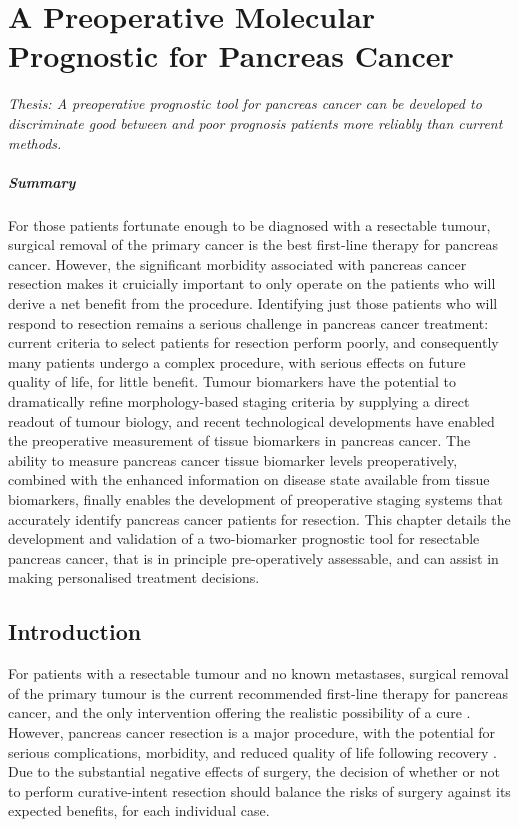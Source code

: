 \documentclass[dissertation.tex]{subfiles}
\begin{document}
\chapter{A Preoperative Molecular Prognostic for Pancreas Cancer}
\label{chap:nomogram}

\emph{Thesis: A preoperative prognostic tool for pancreas cancer can be developed to discriminate good between and poor prognosis patients more reliably than current methods.}

\paragraph{Summary}
For those patients fortunate enough to be diagnosed with a resectable tumour, surgical removal of the primary cancer is the best first-line therapy for pancreas cancer.  However, the significant morbidity associated with pancreas cancer resection makes it cruicially important to only operate on the patients who will derive a net benefit from the procedure.  Identifying just those patients who will respond to resection remains a serious challenge in pancreas cancer treatment: current criteria to select patients for resection perform poorly, and consequently many patients undergo a complex procedure, with serious effects on future quality of life, for little benefit.  Tumour biomarkers have the potential to dramatically refine morphology-based staging criteria by supplying a direct readout of tumour biology, and recent technological developments have enabled the preoperative measurement of tissue biomarkers in pancreas cancer.  The ability to measure pancreas cancer tissue biomarker levels preoperatively, combined with the enhanced information on disease state available from tissue biomarkers, finally enables the development of preoperative staging systems that accurately identify pancreas cancer patients for resection.  This chapter details the development and validation of a two-biomarker prognostic tool for resectable pancreas cancer, that is in principle pre-operatively assessable, and can assist in making personalised treatment decisions.


\section{Introduction}
For patients with a resectable tumour and no known metastases, surgical removal of the primary tumour is the current recommended first-line therapy for pancreas cancer, and the only intervention offering the realistic possibility of a cure \cite{Editors2015}.  However, pancreas cancer resection is a major procedure, with the potential for serious complications, morbidity, and reduced quality of life following recovery \cite{Ho2005}.  Due to the substantial negative effects of surgery, the decision of whether or not to perform curative-intent resection should balance the risks of surgery against its expected benefits, for each individual case.
\end{document}
